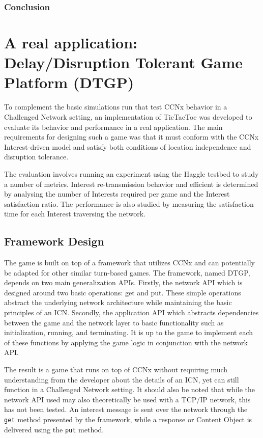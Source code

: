 \documentclass[a4paper,12pt]{report}      %
\begin{document}

\subsection{Conclusion}


\pagebreak
\chapter{A real application: Delay/Disruption Tolerant Game Platform (DTGP)}

To complement the basic simulations run that test CCNx behavior in a Challenged Network setting, an
implementation of TicTacToe was developed to evaluate its behavior and performance in a real
application. The main requirements for designing such a game was that it must conform with the
CCNx Interest-driven model and satisfy both conditions of location independence and disruption
tolerance. 

The evaluation involves running an experiment using the Haggle testbed to study a number of metrics. 
Interest re-transmission behavior and efficient is determined by analysing the number of Interests
 required per game and the Interest satisfaction ratio. The performance is also studied by measuring 
the satisfaction time for each Interest traversing the network.    

\section{Framework Design}

The game is built on top of a framework that utilizes CCNx and can potentially be adapted for other
similar turn-based games. The framework, named DTGP, depends on two main generalization APIs.
Firstly, the network API which is designed around two basic operations: get and put. These simple
operations abstract the underlying network architecture while maintaining the basic principles of an
ICN. Secondly, the application API which abstracts dependencies between the game and the
network layer to basic functionality such as initialization, running, and terminating. It is up to the game
to implement each of these functions by applying the game logic in conjunction with the network API.

The result is a game that runs on top of CCNx without requiring much understanding from the
developer about the details of an ICN, yet can still function in a Challenged Network setting. It should
also be noted that while the network API used may also theoretically be used with a TCP/IP network,
this has not been tested. An interest message is sent over the network through the \verb!get! method presented
 by the framework, while  a response or Content Object is delivered using the \verb!put! method. 
\end{document}
